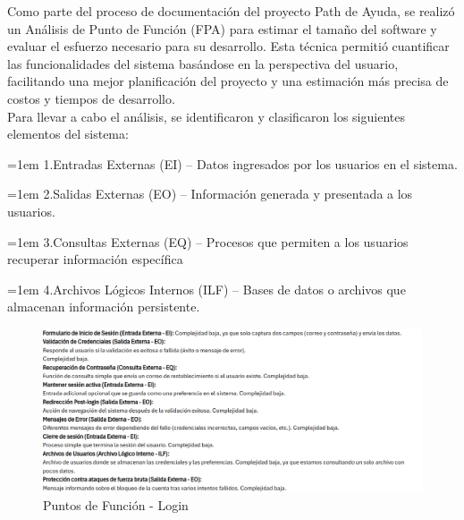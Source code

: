 \documentclass[12pt,letterpaper,spanish, xcolor=table]{report}
\numberwithin{figure}{subsection}
\begin{document}
	Como parte del proceso de documentación del proyecto Path de Ayuda, se realizó un Análisis de Punto de Función (FPA) para estimar el tamaño del software y evaluar el esfuerzo necesario para su desarrollo. Esta técnica permitió cuantificar las funcionalidades del sistema basándose en la perspectiva del usuario, facilitando una mejor planificación del proyecto y una estimación más precisa de costos y tiempos de desarrollo.\\
	
	Para llevar a cabo el análisis, se identificaron y clasificaron los siguientes elementos del sistema:\\
	
	{\leftskip=1em 
	  \noindent 
		1.Entradas Externas (EI) – Datos ingresados por los usuarios en el sistema.
	\par}
	
	{\leftskip=1em 
	  \noindent 
		2.Salidas Externas (EO) – Información generada y presentada a los usuarios.
	\par}
	
	{\leftskip=1em 
	  \noindent 
		3.Consultas Externas (EQ) – Procesos que permiten a los usuarios recuperar información específica
	\par}

	{\leftskip=1em 
	  \noindent 
		4.Archivos Lógicos Internos (ILF) – Bases de datos o archivos que almacenan información persistente.
	\par}

	\begin{figure}[htp]
		\centering
		\includegraphics[width=1.0\textwidth]
		{Imagenes/PathAyuda/FpsLogin.png}
		\caption{Puntos de Función - Login}\label{a1}
	\end{figure}
	
\end{document}
